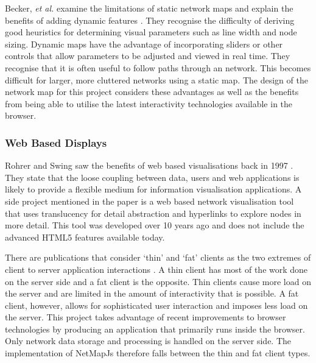 \documentclass[11pt, a4paper]{article}
\begin{document}
Becker, \emph{et al.} examine the limitations of static network maps and explain
the benefits of adding dynamic features \cite{Becker_1990}. They recognise the
difficulty of deriving good heuristics for determining visual parameters such as
line width and node sizing. Dynamic maps have the advantage of incorporating
sliders or other controls that allow parameters to be adjusted and viewed in
real time. They recognise that it is often useful to follow paths through an
network. This becomes difficult for larger, more cluttered networks using
a static map. The design of the network map for this project considers these
advantages as well as the benefits from being able to utilise the latest
interactivity technologies available in the browser.



\subsubsection{Web Based Displays}
\label{sec:web-based-displays}

Rohrer and Swing saw the benefits of web based visualisations back in 1997
\cite{Rohrer_1997}. They state that the loose coupling between data, users and
web applications is likely to provide a flexible medium for information
visualisation applications.  A side project mentioned in the paper is a web
based network visualisation tool that uses translucency for detail abstraction
and hyperlinks to explore nodes in more detail. This tool was developed over 10
years ago and does not include the advanced HTML5 features available today.

  
There are publications that consider `thin' and `fat' clients as the two
extremes of client to server application interactions
\cite{Eick_2007}\cite{Jern_1998}. A thin client has most of the work done on the
server side and a fat client is the opposite. Thin clients cause more load on
the server and are limited in the amount of interactivity that is possible. A
fat client, however, allows for sophisticated user interaction and imposes less
load on the server. This project takes advantage of recent improvements to
browser technologies by producing an application that primarily runs inside the
browser. Only network data storage and processing is handled on the server side.
The implementation of NetMapJs therefore falls between the thin and fat client
types.
\end{document}
